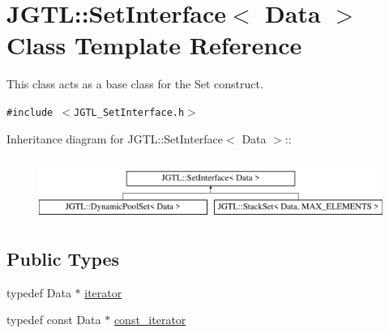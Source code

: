 \hypertarget{class_j_g_t_l_1_1_set_interface}{
\section{JGTL::Set\-Interface$<$ Data $>$ Class Template Reference}
\label{class_j_g_t_l_1_1_set_interface}
}
This class acts as a base class for the Set construct.  


{\tt \#include $<$JGTL\_\-Set\-Interface.h$>$}

Inheritance diagram for JGTL::Set\-Interface$<$ Data $>$::\begin{figure}[H]
\begin{center}
\leavevmode
\includegraphics[height=2cm]{class_j_g_t_l_1_1_set_interface}
\end{center}
\end{figure}
\subsection*{Public Types}
\begin{CompactItemize}
\item 
typedef Data $\ast$ \hyperlink{class_j_g_t_l_1_1_set_interface_1f4b953e9a9adb5d463b6abb24623372}{iterator}
\item 
typedef const Data $\ast$ \hyperlink{class_j_g_t_l_1_1_set_interface_1e545e77790db36de24904dc70054225}{const\_\-iterator}
\end{CompactItemize}
